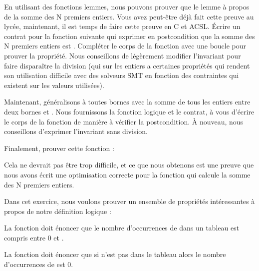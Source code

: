 



En utilisant des fonctions lemmes, nous pouvons prouver que le lemme à
propos de la somme des N premiers entiers. Vous avez peut-être déjà fait cette
preuve au lycée, maintenant, il est temps de faire cette preuve en C et ACSL.
Écrire un contrat pour la fonction suivante qui exprimer en postcondition que la
somme des N premiers entiers est . Compléter le corps de la
fonction avec une boucle pour prouver la propriété. Nous conseillons de légèrement
modifier l'invariant pour faire disparaître la division (qui sur les entiers a
certaines propriétés qui rendent son utilisation difficile avec des solveurs SMT
en fonction des contraintes qui existent sur les valeurs utilisées). 




Maintenant, généralisons à toutes bornes avec la somme de tous les entiers entre
deux bornes  et . Nous fournissons la fonction
logique et le contrat, à vous d'écrire le corps de la fonction de manière à vérifier
la postcondition. À nouveau, nous conseillons d'exprimer l'invariant sans division.




Finalement, prouver cette fonction :




Cela ne devrait pas être trop difficile, et ce que nous obtenons est une preuve
que nous avons écrit une optimisation correcte pour la fonction qui calcule la
somme des N premiers entiers.




Dans cet exercice, nous voulons prouver un ensemble de propriétés intéressantes
à propos de notre définition logique  :




La fonction  doit énoncer que le nombre d'occurrences
de  dans un tableau est compris entre 0 et .


La fonction  doit énoncer que si 
n'est pas dans le tableau alors le nombre d'occurrences de  est 0.


